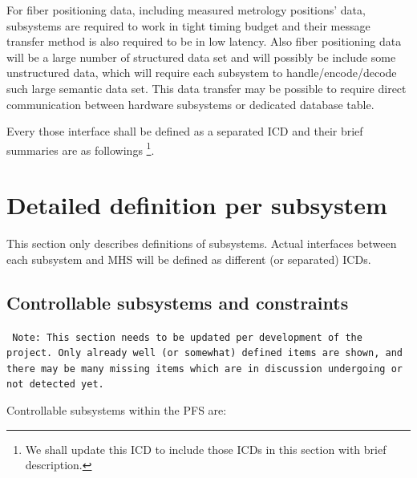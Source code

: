 \documentclass[a4paper,notitlepage]{article}
\begin{document}
For fiber positioning data, including measured metrology positions' data, 
subsystems are required to work in tight timing budget and their message 
transfer method is also required to be in low latency. 
Also fiber positioning data will be a large number of structured data set 
and will possibly be include some unstructured data, which will require 
each subsystem to handle/encode/decode such large semantic data set. 
This data transfer may be possible to require direct communication between 
hardware subsystems or dedicated database table. 

Every those interface shall be defined as a separated ICD and their brief 
summaries are as followings 
\footnote{We shall update this ICD to include those ICDs in this section 
with brief description.}.

\section{Detailed definition per subsystem}

This section only describes definitions of subsystems. 
Actual interfaces between each subsystem and MHS will be defined as different 
(or separated) ICDs.

\subsection{Controllable subsystems and constraints}
\label{sec:subsystem.def.list}

{\tt 
Note: This section needs to be updated per development of the project. 
Only already well (or somewhat) defined items are shown, and there may be 
many missing items which are in discussion undergoing or not detected yet. 
}

Controllable subsystems within the PFS are: 
\end{document}

